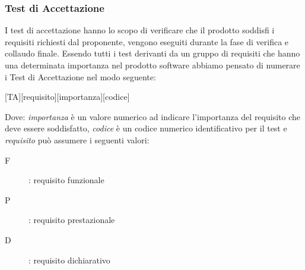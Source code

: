\documentclass[../piano-di-qualifica.tex]{subfiles}
\begin{document}
  \subsubsection{Test di Accettazione}%
  \label{subs:accettazione}
      I test di accettazione hanno lo scopo di verificare che il prodotto soddisfi i requisiti richiesti dal proponente, vengono eseguiti durante la fase di verifica e collaudo finale.
      Essendo tutti i test derivanti da un gruppo di requisiti che hanno una determinata importanza nel prodotto software abbiamo pensato di numerare i Test di Accettazione nel modo seguente:
      \begin{center}
          [TA][requisito][importanza][codice]
      \end{center}
      Dove: \textit{importanza} è un valore numerico ad indicare l'importanza del requisito che deve essere soddisfatto, \textit{codice} è un codice numerico identificativo per il test e \textit{requisito} può assumere i seguenti valori:
      \begin{description}
        \item [F]: requisito funzionale
        \item [P]: requisito prestazionale
        \item [D]: requisito dichiarativo
      \end{description}
\end{document}
